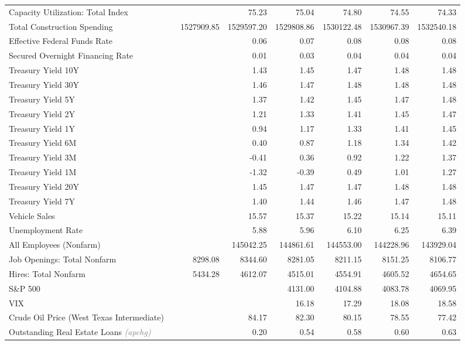 \documentclass[11pt, letterpaper]{article}\usepackage[]{graphicx}\usepackage[]{color}
\begin{document}
\begin{table}[H]
\begin{tabular}{lrrrrrrr}
  Capacity Utilization: Total Index &  &  & 75.23 & 75.04 & 74.80 & 74.55 & 74.33 \\ 
  Total Construction Spending &  & 1527909.85 & 1529597.20 & 1529808.86 & 1530122.48 & 1530967.39 & 1532540.18 \\ 
  Effective Federal Funds Rate &  &  & 0.06 & 0.07 & 0.08 & 0.08 & 0.08 \\ 
  Secured Overnight Financing Rate &  &  & 0.01 & 0.03 & 0.04 & 0.04 & 0.04 \\ 
  Treasury Yield 10Y &  &  & 1.43 & 1.45 & 1.47 & 1.48 & 1.48 \\ 
  Treasury Yield 30Y &  &  & 1.46 & 1.47 & 1.48 & 1.48 & 1.48 \\ 
  Treasury Yield 5Y &  &  & 1.37 & 1.42 & 1.45 & 1.47 & 1.48 \\ 
  Treasury Yield 2Y &  &  & 1.21 & 1.33 & 1.41 & 1.45 & 1.47 \\ 
  Treasury Yield 1Y &  &  & 0.94 & 1.17 & 1.33 & 1.41 & 1.45 \\ 
  Treasury Yield 6M &  &  & 0.40 & 0.87 & 1.18 & 1.34 & 1.42 \\ 
  Treasury Yield 3M &  &  & -0.41 & 0.36 & 0.92 & 1.22 & 1.37 \\ 
  Treasury Yield 1M &  &  & -1.32 & -0.39 & 0.49 & 1.01 & 1.27 \\ 
  Treasury Yield 20Y &  &  & 1.45 & 1.47 & 1.47 & 1.48 & 1.48 \\ 
  Treasury Yield 7Y &  &  & 1.40 & 1.44 & 1.46 & 1.47 & 1.48 \\ 
  Vehicle Sales &  &  & 15.57 & 15.37 & 15.22 & 15.14 & 15.11 \\ 
  Unemployment Rate &  &  & 5.88 & 5.96 & 6.10 & 6.25 & 6.39 \\ 
  All Employees (Nonfarm) &  &  & 145042.25 & 144861.61 & 144553.00 & 144228.96 & 143929.04 \\ 
  Job Openings: Total Nonfarm &  & 8298.08 & 8344.60 & 8281.05 & 8211.15 & 8151.25 & 8106.77 \\ 
  Hires: Total Nonfarm &  & 5434.28 & 4612.07 & 4515.01 & 4554.91 & 4605.52 & 4654.65 \\ 
  S\&P 500 &  &  &  & 4131.00 & 4104.88 & 4083.78 & 4069.95 \\ 
  VIX &  &  &  & 16.18 & 17.29 & 18.08 & 18.58 \\ 
  Crude Oil Price (West Texas Intermediate) &  &  & 84.17 & 82.30 & 80.15 & 78.55 & 77.42 \\ 
  Outstanding Real Estate Loans \textit{\footnotesize\textcolor{gray}{(apchg)}} &  &  & 0.20 & 0.54 & 0.58 & 0.60 & 0.63 \\ 

\end{tabular}
\end{table}
\end{document}
